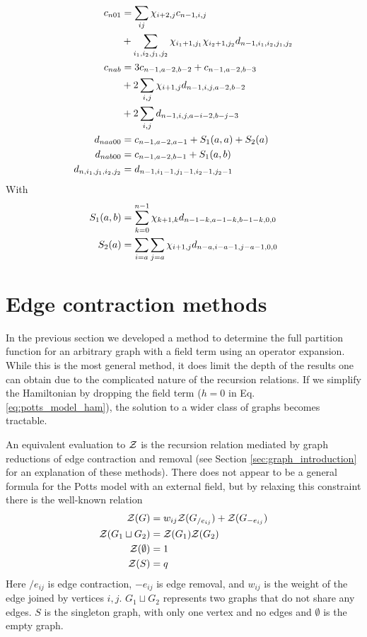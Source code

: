 {
\allowdisplaybreaks
\begin{align}
c_{n01}&= \sum_{ij} \chi_{i+2, j} c_{n-1, i,j}   \\ \notag
		 &+ \sum_{i_1,i_2,j_1,j_2} \chi_{i_1+1, j_1} 
		 		\chi_{i_2+1, j_2} d_{n-1,i_1,i_2,j_1,j_2} \\ 
c_{nab} &= 3 c_{n-1, a-2,b-2} + c_{n-1, a-2,b-3} \\ \notag
		  &+ 2 \sum_{i,j} \chi_{i+1, j}  d_{n-1,i,j,a-2,b-2} \\ \notag
		  &+ 2 \sum_{i,j} d_{n-1,i,j,a-i-2,b-j-3} \\
d_{n a a00} &= c_{n-1, a-2,a-1} + S_1(a,a) + S_2(a) \\ \notag
d_{nab00} &= c_{n-1, a-2,b-1} + S_1(a,b) \\ \notag
d_{n,i_1,j_1,i_2,j_2} &= d_{n-1,i_1-1,j_1-1,i_2-1,j_2-1}
\end{align}
With
\begin{align}
S_1(a,b) &= \sum_{k=0}^{n-1} \chi_{k+1, k} d_{n-1-k,a-1-k,b-1-k,0,0} \\
S_2(a) &= \sum_{i=a}\sum_{j=a} \chi_{i+1, j} d_{n-a,i-a-1,j-a-1,0,0}
\end{align}
}

\section{Edge contraction methods}
\label{sec:edge_contraction_methods}

In the previous section we developed a method to determine the full partition function for an arbitrary graph with a field term using an operator expansion. While this is the most general method, it does limit the depth of the results one can obtain due to the complicated nature of the recursion relations. If we simplify the Hamiltonian by dropping the field term ($h=0$ in Eq. \ref{eq:potts_model_ham}), the solution to a wider class of graphs becomes tractable.

An equivalent evaluation to $\mathcal{Z}$ is the recursion relation mediated by graph reductions of edge contraction and removal (see Section \ref{sec:graph_introduction} for an explanation of these methods). There does not appear to be a general formula for the Potts model with an external field, but by relaxing this constraint there is the well-known relation\cite{godlin_graph_2008}
\begin{align}
\mathcal{Z}(G) &= w_{ij} \mathcal{Z}(G_{/ e_{ij}}) + \mathcal{Z}(G_{- e_{ij}}) \\
\mathcal{Z}(G_1 \sqcup G_2) &= \mathcal{Z}(G_1) \mathcal{Z}(G_2) \\
\mathcal{Z}(\emptyset) &= 1 \\
\mathcal{Z}(S) &= q
\end{align}
Here $/ e_{ij}$ is edge contraction, $-e_{ij}$ is edge removal, and $w_{ij}$ is the weight of the edge joined by vertices $i,j$. $G_1 \sqcup G_2$ represents two graphs that do not share any edges. $S$ is the singleton graph, with only one vertex and no edges and $\emptyset$ is the empty graph.

